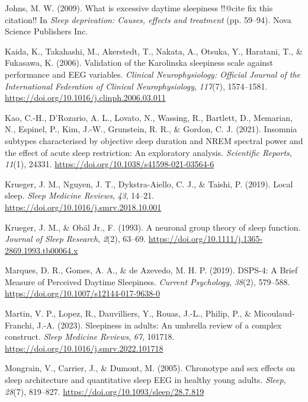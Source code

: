 \documentclass[
]{article}
\newlength{\cslhangindent}
\newenvironment{CSLReferences}[2] %
 {\begin{list}{}{%
  \setlength{\itemindent}{0pt}
  \setlength{\leftmargin}{0pt}
  \setlength{\parsep}{0pt}
  \ifodd #1
   \setlength{\leftmargin}{\cslhangindent}
   \setlength{\itemindent}{-1\cslhangindent}
  \fi
  \setlength{\itemsep}{#2\baselineskip}}}
 {\end{list}}
\begin{document}
\begin{CSLReferences}{1}{0}
Johns, M. W. (2009). What is excessive daytime sleepiness !!@cite fix
this citation!! In \emph{Sleep deprivation: {Causes}, effects and
treatment} (pp. 59--94). Nova Science Publishers Inc.

Kaida, K., Takahashi, M., Akerstedt, T., Nakata, A., Otsuka, Y.,
Haratani, T., \& Fukasawa, K. (2006). Validation of the {Karolinska}
sleepiness scale against performance and {EEG} variables. \emph{Clinical
Neurophysiology: Official Journal of the International Federation of
Clinical Neurophysiology}, \emph{117}(7), 1574--1581.
\url{https://doi.org/10.1016/j.clinph.2006.03.011}

Kao, C.-H., D'Rozario, A. L., Lovato, N., Wassing, R., Bartlett, D.,
Memarian, N., Espinel, P., Kim, J.-W., Grunstein, R. R., \& Gordon, C.
J. (2021). Insomnia subtypes characterised by objective sleep duration
and {NREM} spectral power and the effect of acute sleep restriction:
{An} exploratory analysis. \emph{Scientific Reports}, \emph{11}(1),
24331. \url{https://doi.org/10.1038/s41598-021-03564-6}

Krueger, J. M., Nguyen, J. T., Dykstra-Aiello, C. J., \& Taishi, P.
(2019). Local sleep. \emph{Sleep Medicine Reviews}, \emph{43}, 14--21.
\url{https://doi.org/10.1016/j.smrv.2018.10.001}

Krueger, J. M., \& Obäl Jr., F. (1993). A neuronal group theory of sleep
function. \emph{Journal of Sleep Research}, \emph{2}(2), 63--69.
\url{https://doi.org/10.1111/j.1365-2869.1993.tb00064.x}

Marques, D. R., Gomes, A. A., \& de Azevedo, M. H. P. (2019). {DSPS-4}:
A {Brief Measure} of {Perceived Daytime Sleepiness}. \emph{Current
Psychology}, \emph{38}(2), 579--588.
\url{https://doi.org/10.1007/s12144-017-9638-0}

Martin, V. P., Lopez, R., Dauvilliers, Y., Rouas, J.-L., Philip, P., \&
Micoulaud-Franchi, J.-A. (2023). Sleepiness in adults: {An} umbrella
review of a complex construct. \emph{Sleep Medicine Reviews}, \emph{67},
101718. \url{https://doi.org/10.1016/j.smrv.2022.101718}

Mongrain, V., Carrier, J., \& Dumont, M. (2005). Chronotype and sex
effects on sleep architecture and quantitative sleep {EEG} in healthy
young adults. \emph{Sleep}, \emph{28}(7), 819--827.
\url{https://doi.org/10.1093/sleep/28.7.819}


\end{CSLReferences}
\end{document}
